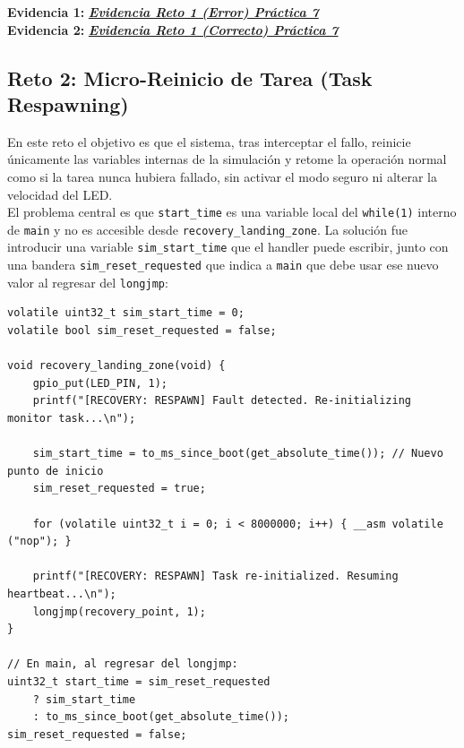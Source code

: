 \documentclass[12pt,letterpaper]{article}
\begin{document}
\textbf{Evidencia 1:}
\href{https://drive.google.com/file/d/1Hh8ghAZ_HhTtK0zuvYGGHo4ie9aAXv0f/view?usp=sharing&t=56.761}
     {\textbf{\textit{\textcolor{linkblue}{Evidencia Reto 1 (Error) Práctica 7}}}}\\

\textbf{Evidencia 2:}
\href{https://drive.google.com/file/d/1Hh8ghAZ_HhTtK0zuvYGGHo4ie9aAXv0f/view?usp=sharing&t=90.74}
     {\textbf{\textit{\textcolor{linkblue}{Evidencia Reto 1 (Correcto) Práctica 7}}}}

\subsection*{Reto 2: Micro-Reinicio de Tarea (Task Respawning)}
En este reto el objetivo es que el sistema, tras interceptar el fallo, reinicie únicamente las variables
internas de la simulación y retome la operación normal como si la tarea nunca hubiera fallado, sin activar el
modo seguro ni alterar la velocidad del LED.\\
 
El problema central es que \texttt{start\_time} es una variable local del \texttt{while(1)} interno de
\texttt{main} y no es accesible desde \texttt{recovery\_landing\_zone}. La solución fue introducir una variable
\texttt{sim\_start\_time} que el handler puede escribir, junto con una bandera \texttt{sim\_reset\_requested}
que indica a \texttt{main} que debe usar ese nuevo valor al regresar del \texttt{longjmp}:
 
\begin{lstlisting}[style=modernc, caption={Task Respawning: reinicio de variables de simulación}]
volatile uint32_t sim_start_time = 0;
volatile bool sim_reset_requested = false;
 
void recovery_landing_zone(void) {
    gpio_put(LED_PIN, 1);
    printf("[RECOVERY: RESPAWN] Fault detected. Re-initializing monitor task...\n");
 
    sim_start_time = to_ms_since_boot(get_absolute_time()); // Nuevo punto de inicio
    sim_reset_requested = true;
 
    for (volatile uint32_t i = 0; i < 8000000; i++) { __asm volatile ("nop"); }
 
    printf("[RECOVERY: RESPAWN] Task re-initialized. Resuming heartbeat...\n");
    longjmp(recovery_point, 1);
}
 
// En main, al regresar del longjmp:
uint32_t start_time = sim_reset_requested
    ? sim_start_time
    : to_ms_since_boot(get_absolute_time());
sim_reset_requested = false;
\end{lstlisting}
\end{document}

